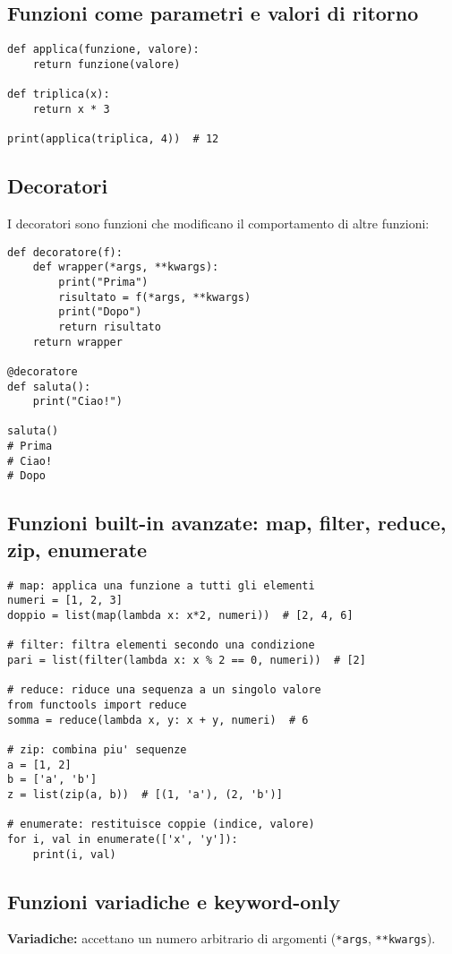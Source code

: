 \documentclass[a4paper,12pt]{article}
\begin{document}
\subsection*{Funzioni come parametri e valori di ritorno}
\begin{lstlisting}
def applica(funzione, valore):
    return funzione(valore)

def triplica(x):
    return x * 3

print(applica(triplica, 4))  # 12
\end{lstlisting}

\subsection*{Decoratori}
I decoratori sono funzioni che modificano il comportamento di altre funzioni:

\begin{lstlisting}
def decoratore(f):
    def wrapper(*args, **kwargs):
        print("Prima")
        risultato = f(*args, **kwargs)
        print("Dopo")
        return risultato
    return wrapper

@decoratore
def saluta():
    print("Ciao!")

saluta()
# Prima
# Ciao!
# Dopo
\end{lstlisting}

\subsection*{Funzioni built-in avanzate: map, filter, reduce, zip, enumerate}
\begin{lstlisting}
# map: applica una funzione a tutti gli elementi
numeri = [1, 2, 3]
doppio = list(map(lambda x: x*2, numeri))  # [2, 4, 6]

# filter: filtra elementi secondo una condizione
pari = list(filter(lambda x: x % 2 == 0, numeri))  # [2]

# reduce: riduce una sequenza a un singolo valore
from functools import reduce
somma = reduce(lambda x, y: x + y, numeri)  # 6

# zip: combina piu' sequenze
a = [1, 2]
b = ['a', 'b']
z = list(zip(a, b))  # [(1, 'a'), (2, 'b')]

# enumerate: restituisce coppie (indice, valore)
for i, val in enumerate(['x', 'y']):
    print(i, val)
\end{lstlisting}

\subsection*{Funzioni variadiche e keyword-only}
\textbf{Variadiche:} accettano un numero arbitrario di argomenti (\texttt{*args}, \texttt{**kwargs}).
\end{document}
